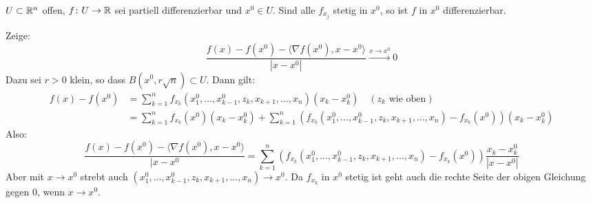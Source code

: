 \begin{lemma}
	$ U\subset\mathbb{R}^n $ offen, $ f\colon U\rightarrow\mathbb{R} $ sei partiell differenzierbar und $ x^0\in U $. Sind alle $ f_{x_j} $ stetig in $ x^0 $, so ist $ f $ in $ x^0 $ differenzierbar.
\end{lemma}
\begin{beweis}
	Zeige:
	\[ \frac{f(x)-f(x^0)-\langle\nabla f(x^0),x-x^0\rangle}{|x-x^0|}\xrightarrow{x\to x^0}0 \]
	Dazu sei $ r>0 $ klein, so dass $ B(x^0,r\sqrt{n})\subset U $. Dann gilt:
	\begin{align*} f(x)-f(x^0)&=\sum_{k=1}^{n}f_{x_k}(x_1^0,...,x_{k-1}^0,z_k,x_{k+1},...,x_n)(x_k-x_k^0)\quad (z_k\text{ wie oben})\\
	&=\sum_{k=1}^{n}f_{x_k}(x^0)(x_k-x_k^0)+\sum_{k=1}^{n}(f_{x_k}(x_1^0,...,x_{k-1}^0,z_k,x_{k+1},...,x_n)-f_{x_k}(x^0))(x_k-x_k^0) \end{align*}
	Also:
	\[ \frac{f(x)-f(x^0)-\langle\nabla f(x^0),x-x^0\rangle}{|x-x^0}=\sum_{k=1}^{n}(f_{x_k}(x_1^0,...,x_{k-1}^0,z_k,x_{k+1},...,x_n)-f_{x_k}(x^0))\frac{x_k-x_k^0}{|x-x^0|} \]
	Aber mit $ x\to x^0 $ strebt auch $ (x_1^0,...,x_{k-1}^0,z_k,x_{k+1},...,x_n)\to x^0 $. Da $ f_{x_k} $ in $ x^0 $ stetig ist geht auch die rechte Seite der obigen Gleichung gegen $ 0 $, wenn $ x\to x^0 $.
\end{beweis}
